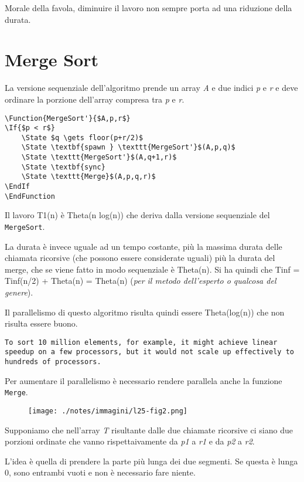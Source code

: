 Morale della favola, diminuire il lavoro non sempre porta ad una
riduzione della durata.

\section{Merge Sort}\label{merge-sort}

La versione sequenziale dell'algoritmo prende un array \emph{A} e due
indici \emph{p} e \emph{r} e deve ordinare la porzione dell'array
compresa tra \emph{p} e \emph{r}.

\begin{verbatim}
\Function{MergeSort'}{$A,p,r$}
\If{$p < r$}
    \State $q \gets floor(p+r/2)$
    \State \textbf{spawn } \texttt{MergeSort'}$(A,p,q)$
    \State \texttt{MergeSort'}$(A,q+1,r)$
    \State \textbf{sync}
    \State \texttt{Merge}$(A,p,q,r)$
\EndIf
\EndFunction
\end{verbatim}

Il lavoro T1(n) è Theta(n log(n)) che deriva dalla versione sequenziale
del \texttt{MergeSort}.

La durata è invece uguale ad un tempo costante, più la massima durata
delle chiamata ricorsive (che possono essere considerate uguali) più la
durata del merge, che se viene fatto in modo sequenziale è Theta(n). Si
ha quindi che Tinf = Tinf(n/2) + Theta(n) = Theta(n) (\emph{per il
metodo dell'esperto o qualcosa del genere}).

Il parallelismo di questo algoritmo risulta quindi essere Theta(log(n))
che non risulta essere buono.

\begin{verbatim}
To sort 10 million elements, for example, it might achieve linear speedup on a few processors, but it would not scale up effectively to hundreds of processors.
\end{verbatim}

Per aumentare il parallelismo è necessario rendere parallela anche la
funzione \texttt{Merge}.

\begin{figure}[htbp]
\centering
\texttt{[image: ./notes/immagini/l25-fig2.png]}
\caption{}
\end{figure}

Supponiamo che nell'array \emph{T} risultante dalle due chiamate
ricorsive ci siano due porzioni ordinate che vanno rispettaivamente da
\emph{p1} a \emph{r1} e da \emph{p2} a \emph{r2}.

L'idea è quella di prendere la parte più lunga dei due segmenti. Se
questa è lunga 0, sono entrambi vuoti e non è necessario fare niente.

